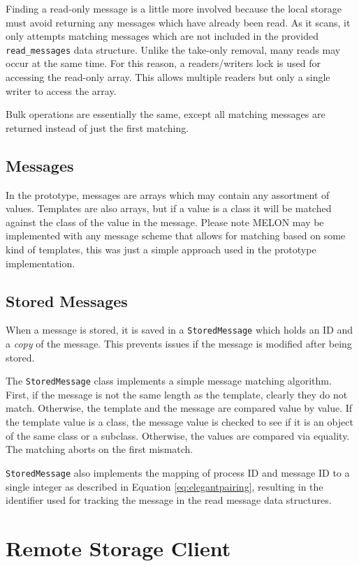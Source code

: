 Finding a read-only message is a little more involved because the local storage must avoid returning any messages which have already been read. As it scans, it only attempts matching messages which are not included in the provided \texttt{read\_messages} data structure. Unlike the take-only removal, many reads may occur at the same time. For this reason, a readers/writers lock is used for accessing the read-only array. This allows multiple readers but only a single writer to access the array.

Bulk operations are essentially the same, except all matching messages are returned instead of just the first matching.

\subsection{Messages}

In the prototype, messages are arrays which may contain any assortment of values. Templates are also arrays, but if a value is a class it will be matched against the class of the value in the message. Please note MELON may be implemented with any message scheme that allows for matching based on some kind of templates, this was just a simple approach used in the prototype implementation.

\subsection{Stored Messages}

When a message is stored, it is saved in a \texttt{StoredMessage} which holds an ID and a \textit{copy} of the message. This prevents issues if the message is modified after being stored.

The \texttt{StoredMessage} class implements a simple message matching algorithm. First, if the message is not the same length as the template, clearly they do not match. Otherwise, the template and the message are compared value by value. If the template value is a class, the message value is checked to see if it is an object of the same class or a subclass. Otherwise, the values are compared via equality. The matching aborts on the first mismatch.

\texttt{StoredMessage} also implements the mapping of process ID and message ID to a single integer as described in Equation \ref{eq:elegantpairing}, resulting in the identifier used for tracking the message in the read message data structures.

\section{Remote Storage Client}

